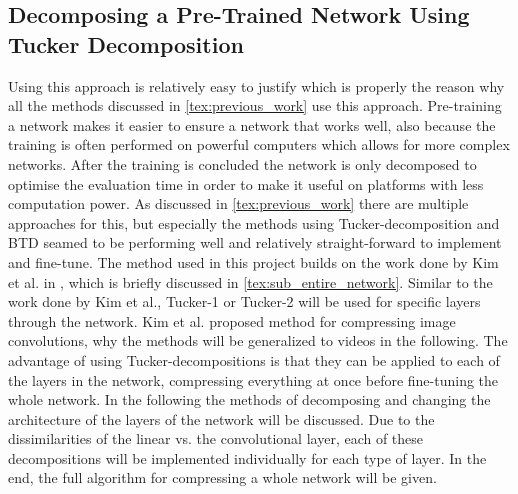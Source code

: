 \subsection{Decomposing a Pre-Trained Network Using Tucker Decomposition}
Using this approach is relatively easy to justify which is properly the reason why all the methods discussed in \autoref{tex:previous_work} use this approach. Pre-training a network makes it easier to ensure a network that works well, also because the training is often performed on powerful computers which allows for more complex networks. After the training is concluded the network is only decomposed to optimise the evaluation time in order to make it useful on platforms with less computation power. As discussed in \autoref{tex:previous_work} there are multiple approaches for this, but especially the methods using Tucker-decomposition and BTD seamed to be performing well and relatively straight-forward to implement and fine-tune.
The method used in this project builds on the work done by Kim et al. in \cite{Kim2016}, which is briefly discussed in \autoref{tex:sub_entire_network}.  Similar to the work done by Kim et al., Tucker-1 or Tucker-2 will be used for specific layers through the network. Kim et al. proposed method for compressing image convolutions, why the methods will be generalized to videos in the following. The advantage of using Tucker-decompositions is that they can be applied to each of the layers in the network, compressing everything at once before fine-tuning the whole network. In the following the methods of decomposing and changing the architecture of the layers of the network will be discussed. Due to the dissimilarities of the linear vs. the convolutional layer, each of these decompositions will be implemented individually for each type of layer. In the end, the full algorithm for compressing a whole network will be given.

